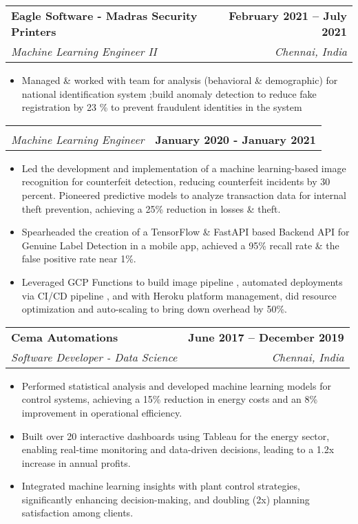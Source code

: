 \documentclass[letterpaper,11pt]{article}
\makeatletter
\newcommand{\resumeItem}[1]{
  \item\small{
    {#1 \vspace{-2pt}}
  }
}
\newcommand{\resumeSubheading}[4]{
  \vspace{-2pt}\item
    \begin{tabular*}{0.97\textwidth}[t]{l@{\extracolsep{\fill}}r}
      \textbf{#1} & \textbf{#2} \\
      \textit{\small#3} & \textit{\small #4} \\
    \end{tabular*}\vspace{-7pt}
}
\newcommand{\resumeSubheadingsub}[4]{
  \vspace{-2pt}\item
    \begin{tabular*}{0.97\textwidth}[t]{l@{\extracolsep{\fill}}r}
      \textbf{#1} & \textbf{#2} \\
      \textit{\small#3} & \textbf{#4} \\
    \end{tabular*}\vspace{-7pt}
}
\newcommand{\resumeItemListStart}{\begin{itemize}}
\newcommand{\resumeItemListEnd}{\end{itemize}\vspace{-5pt}}
\makeatother
\begin{document}
    \resumeSubheading
        {Eagle Software - Madras Security Printers}{February 2021 -- July 2021}
        {Machine Learning Engineer II}{Chennai, India}
        \resumeItemListStart
            \resumeItem{Managed \& worked with team for analysis (behavioral \& demographic) for national identification system ;build anomaly detection to reduce fake registration by 23 \% to prevent fraudulent identities in the system }
            
        \resumeItemListEnd
        
    \vspace{-3pt}
\vspace{-\baselineskip} %
\resumeSubheadingsub
        {}{}
        {Machine Learning Engineer}{January 2020 - January 2021}
        \resumeItemListStart
            \resumeItem{
                Led the development and implementation of a machine learning-based image recognition for counterfeit detection, reducing counterfeit incidents by 30 percent. Pioneered predictive models to analyze transaction data for internal theft prevention, achieving a 25\% reduction in losses \& theft.
            }
            \resumeItem{
                Spearheaded the creation of a TensorFlow \& FastAPI based Backend API for Genuine Label Detection in a mobile app, achieved a 95\% recall rate \& the false positive rate near 1\%.
            }
            \resumeItem{
                Leveraged GCP Functions to build image pipeline , automated deployments via CI/CD pipeline , and with Heroku platform management, did resource optimization and auto-scaling to bring down overhead by 50\%.
            }
        \resumeItemListEnd



  \resumeSubheading
  {Cema Automations}{June 2017 -- December 2019}
  {Software Developer - Data Science }{Chennai, India}
  \resumeItemListStart
      \resumeItem{Performed statistical analysis and developed machine learning models for control systems, achieving a 15\% reduction in energy costs and an 8\% improvement in operational efficiency.}
      \resumeItem{Built over 20 interactive dashboards using Tableau for the energy sector, enabling real-time monitoring and data-driven decisions, leading to a 1.2x increase in annual profits.}
      \resumeItem{Integrated machine learning insights with plant control strategies, significantly enhancing decision-making, and doubling (2x) planning satisfaction among clients.}
  \resumeItemListEnd
\end{document}
